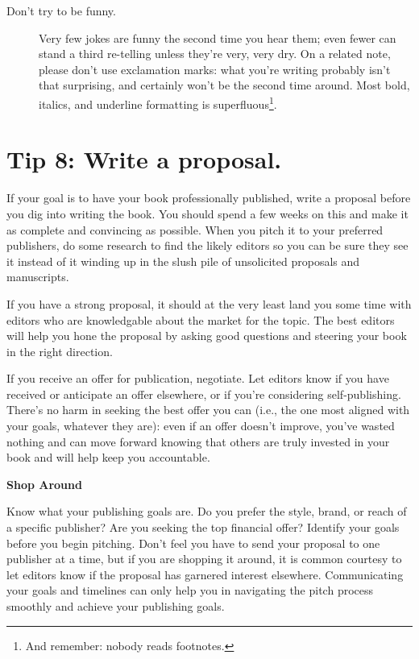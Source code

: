 \documentclass[10pt,letterpaper]{article}
\begin{document}
\begin{description}
\item[Don't try to be funny.]
  Very few jokes are funny the second time you hear them;
  even fewer can stand a third re-telling unless they're very, very dry.
  On a related note,
  please don't use exclamation marks:
  what you're writing probably isn't that surprising,
  and certainly won't be the second time around.
  Most bold, italics, and underline formatting is superfluous\footnote{And remember: nobody reads footnotes.}.

\end{description}

\section*{Tip 8: Write a proposal.}

If your goal is to have your book professionally published,
write a proposal before you dig into writing the book.
You should spend a few weeks on this
and make it as complete and convincing as possible.
When you pitch it to your preferred publishers,
do some research to find the likely editors
so you can be sure they see it
instead of it winding up in the slush pile of unsolicited proposals and manuscripts.

If you have a strong proposal,
it should at the very least land you some time with editors
who are knowledgable about the market for the topic.
The best editors will help you hone the proposal
by asking good questions and steering your book in the right direction.

If you receive an offer for publication, negotiate.
Let editors know if you have received or anticipate an offer elsewhere, 
or if you're considering self-publishing.
There's no harm in seeking the best offer you can (i.e., the one
most aligned with your goals, whatever they are):
even if an offer doesn't improve, you've wasted nothing
and can move forward knowing that others are truly invested in your book
and will help keep you accountable.

\begin{mdframed}
\textbf{Shop Around}

\noindent
Know what your publishing goals are.
Do you prefer the style, brand, or reach of a specific publisher?
Are you seeking the top financial offer?
Identify your goals before you begin pitching.
Don't feel you have to send your proposal to one publisher at a time,
but if you are shopping it around,
it is common courtesy to let editors know if the proposal has garnered interest elsewhere.
Communicating your goals and timelines can only help you
in navigating the pitch process smoothly and achieve your publishing goals.
\end{mdframed}
\end{document}
